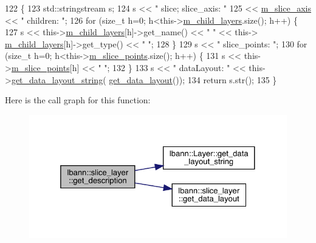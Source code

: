 \begin{DoxyCode}
122                                              \{
123     std::stringstream s;
124     s << \textcolor{stringliteral}{" slice; slice\_axis: "}
125       << \hyperlink{classlbann_1_1slice__layer_a349dcd71f67d77d40247da24e4641ea2}{m\_slice\_axis} << \textcolor{stringliteral}{" children: "};
126     \textcolor{keywordflow}{for} (\textcolor{keywordtype}{size\_t} h=0; h<this->\hyperlink{classlbann_1_1Layer_ae348c0d2b4d05f74d809d09debb633c0}{m\_child\_layers}.size(); h++) \{
127       s << this->\hyperlink{classlbann_1_1Layer_ae348c0d2b4d05f74d809d09debb633c0}{m\_child\_layers}[h]->get\_name() << \textcolor{stringliteral}{" "} << this->
      \hyperlink{classlbann_1_1Layer_ae348c0d2b4d05f74d809d09debb633c0}{m\_child\_layers}[h]->get\_type() << \textcolor{stringliteral}{" "};
128     \}
129     s << \textcolor{stringliteral}{" slice\_points: "};
130     \textcolor{keywordflow}{for} (\textcolor{keywordtype}{size\_t} h=0; h<this->\hyperlink{classlbann_1_1slice__layer_af79dab13a70da2e81209e7ae15166e30}{m\_slice\_points}.size(); h++) \{
131       s << this->\hyperlink{classlbann_1_1slice__layer_af79dab13a70da2e81209e7ae15166e30}{m\_slice\_points}[h] << \textcolor{stringliteral}{" "};
132     \}
133     s << \textcolor{stringliteral}{" dataLayout: "} << this->\hyperlink{classlbann_1_1Layer_ae3f4a5602df821f4221614b1e3782dc1}{get\_data\_layout\_string}(
      \hyperlink{classlbann_1_1slice__layer_a5121b600d26654707289726e84c0eed9}{get\_data\_layout}());
134     \textcolor{keywordflow}{return} s.str();
135   \}
\end{DoxyCode}
Here is the call graph for this function\+:\nopagebreak
\begin{figure}[H]
\begin{center}
\leavevmode
\includegraphics[width=325pt]{classlbann_1_1slice__layer_aa61c1f449a9f741f523921129dfb88e5_cgraph}
\end{center}
\end{figure}
\mbox{\label{classlbann_1_1slice__layer_a824178abe2450bd331304ab0d50214ce}} 
